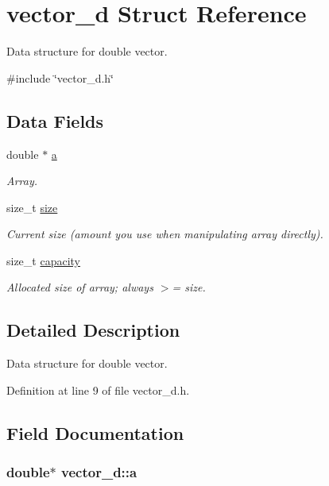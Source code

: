 \hypertarget{structvector__d}{\section{vector\-\_\-d Struct Reference}
\label{structvector__d}
}


Data structure for double vector.  




{\ttfamily \#include \char`\"{}vector\-\_\-d.\-h\char`\"{}}

\subsection*{Data Fields}
\begin{DoxyCompactItemize}
\item 
double $\ast$ \hyperlink{structvector__d_a925832a4ece20022fbe241e7e38ec329}{a}
\begin{DoxyCompactList}\small\item\em Array. \end{DoxyCompactList}\item 
size\-\_\-t \hyperlink{structvector__d_a1a8bccf26d9cef41fd453f6feb2f15b1}{size}
\begin{DoxyCompactList}\small\item\em Current size (amount you use when manipulating array directly). \end{DoxyCompactList}\item 
size\-\_\-t \hyperlink{structvector__d_a83fb5c9689de179f0dfe1413d720cdc3}{capacity}
\begin{DoxyCompactList}\small\item\em Allocated size of array; always $>$= size. \end{DoxyCompactList}\end{DoxyCompactItemize}


\subsection{Detailed Description}
Data structure for double vector. 



Definition at line 9 of file vector\-\_\-d.\-h.



\subsection{Field Documentation}
\hypertarget{structvector__d_a925832a4ece20022fbe241e7e38ec329}{
\subsubsection[{a}]{\setlength{\rightskip}{0pt plus 5cm}double$\ast$ vector\-\_\-d\-::a}}\label{structvector__d_a925832a4ece20022fbe241e7e38ec329}



